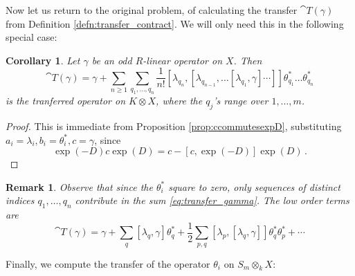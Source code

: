 \documentclass[english,letter paper,12pt,leqno]{article}
\newtheorem{corollary}[theorem]{Corollary}
\theoremstyle{example}
\newtheorem{remark}[theorem]{Remark}
\numberwithin{equation}{section}
\def\be{\begin{equation}}
\def\ee{\end{equation}}
\DeclareMathOperator{\At}{At}
\begin{document}
Now let us return to the original problem, of calculating the transfer $\cat{T}(\gamma)$ from Definition \ref{defn:transfer_contract}. We will only need this in the following special case:

\begin{corollary}\label{corollary_transfergamma} Let $\gamma$ be an odd $R$-linear operator on $X$. Then
\be\label{eq:transfer_gamma}
\cat{T}(\gamma) = \gamma + \sum_{n \ge 1} \sum_{q_1,\ldots,q_n}  \frac{1}{n!} [\lambda_{q_n}, [\lambda_{q_{n-1}}, \ldots [ \lambda_{q_1}, \gamma] \cdots ]] \theta^*_{q_1} \ldots \theta^*_{q_n}
\ee
is the tranferred operator on $K \otimes X$, where the $q_j$'s range over $1, \ldots, m$.
\end{corollary}
\begin{proof}
This is immediate from Proposition \ref{prop:ccommutesexpD}, substituting $a_i = \lambda_i, b_i = \theta_i^*,c = \gamma$, since
\[
\exp(-D) c \exp(D) = c - [c, \exp(-D)] \exp(D)\,.
\]
\end{proof}


\begin{remark} Observe that since the $\theta_i^*$ square to zero, only sequences of distinct indices $q_1,\ldots,q_n$ contribute in the sum \eqref{eq:transfer_gamma}. The low order terms are
\be
\cat{T}(\gamma) = \gamma + \sum_q [\lambda_q, \gamma] \theta^*_q + \frac{1}{2} \sum_{p,q} [\lambda_p, [\lambda_q, \gamma]] \theta_q^*\theta_p^* + \cdots
\ee
\end{remark}

Finally, we compute the transfer of the operator $\theta_i$ on $S_m \otimes_k X$:
\end{document}
